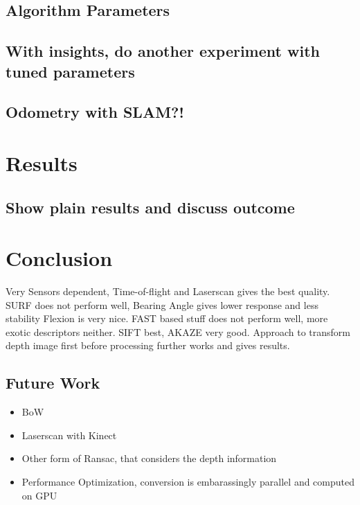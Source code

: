 \subsection{Algorithm Parameters}
\subsection{With insights, do another experiment with tuned parameters}
\subsection{Odometry with SLAM?!}

\section{Results}
\subsection{Show plain results and discuss outcome}

\section{Conclusion}

Very Sensors dependent, Time-of-flight and Laserscan gives the best quality.
SURF does not perform well, Bearing Angle gives lower response and less stability
Flexion is very nice.
FAST based stuff does not perform well, more exotic descriptors neither.
SIFT best, AKAZE very good.
Approach to transform depth image first before processing further works and gives results.

\subsection{Future Work}

\begin{itemize}
    \item BoW
    \item Laserscan with Kinect
    \item Other form of Ransac, that considers the depth information
    \item Performance Optimization, conversion is embarassingly parallel and computed on GPU
\end{itemize}
